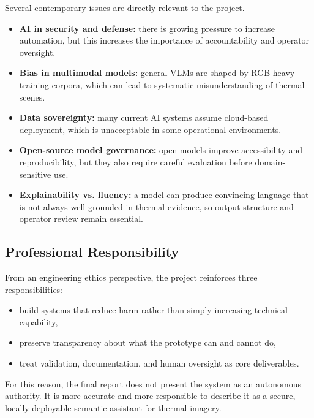Several contemporary issues are directly relevant to the project.

\begin{itemize}[nosep]
  \item \textbf{AI in security and defense:} there is growing pressure to increase automation,
    but this increases the importance of accountability and operator oversight.
  \item \textbf{Bias in multimodal models:} general VLMs are shaped by RGB-heavy training
    corpora, which can lead to systematic misunderstanding of thermal scenes.
  \item \textbf{Data sovereignty:} many current AI systems assume cloud-based deployment,
    which is unacceptable in some operational environments.
  \item \textbf{Open-source model governance:} open models improve accessibility and
    reproducibility, but they also require careful evaluation before domain-sensitive use.
  \item \textbf{Explainability vs. fluency:} a model can produce convincing language that is not
    always well grounded in thermal evidence, so output structure and operator review remain
    essential.
\end{itemize}

\subsection{Professional Responsibility}

From an engineering ethics perspective, the project reinforces three responsibilities:

\begin{itemize}[nosep]
  \item build systems that reduce harm rather than simply increasing technical capability,
  \item preserve transparency about what the prototype can and cannot do,
  \item treat validation, documentation, and human oversight as core deliverables.
\end{itemize}

For this reason, the final report does not present the system as an autonomous authority. It is
more accurate and more responsible to describe it as a secure, locally deployable semantic
assistant for thermal imagery.

